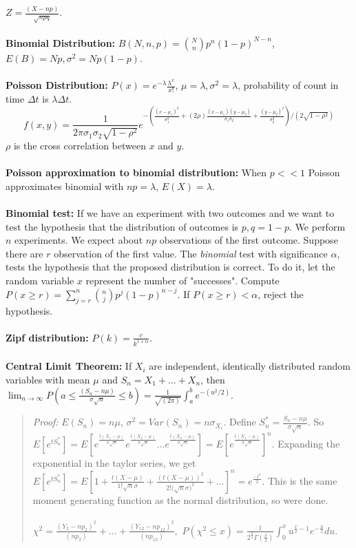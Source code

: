 $Z={\frac {(X-np)} {\sqrt {npq}}}$.
\\
\\
{\bf Binomial Distribution:} $B(N, n, p) = {N \choose n} p^{n}(1-p)^{N-n}$,
$E(B)=Np, \sigma^2= Np(1-p)$.
\\
\\
{\bf Poisson Distribution:} $P(x)= e^{- \lambda} {\frac {\lambda^{x}} {x!}}$, 
$\mu= \lambda, \sigma^2= \lambda$, probability of count in time $\Delta t$ is
$\lambda \Delta t$.  
$$f(x,y)= {\frac 1 {2 \pi \sigma_1 \sigma_2 {\sqrt {1- \rho^2}}}}
e^{- ({\frac {(x-\mu_1)^2} {\sigma_1^2}} +
(2 \rho){\frac {(x-\mu_1)(y- \mu_2)} {\sigma_1 \sigma_2}} +
{\frac {(y-\mu_2)^2} {\sigma_2^2}})/(2 {\sqrt {1-\rho^2}})}$$ 
$\rho$ is the cross correlation between $x$ and $y$.
\\
\\
{\bf Poisson approximation to binomial distribution:}  
When $p<<1$ Poisson approximates binomial with
$np= \lambda$, $E(X)= \lambda$.
\\
\\
{\bf Binomial test:}  If we have an experiment with two outcomes and we want to test the hypothesis that the
distribution of outcomes is $p, q=1-p$.  We perform $n$ experiments.  We expect about $np$ observations of the
first outcome.  Suppose there are $r$ observation of the first value.  The \emph{binomial} test with significance $\alpha$,
tests the hypothesis that the proposed distribution is correct.  To do it, let the random variable
$x$ represent the number of "successes".  Compute $P(x \geq r) = \sum_{j=r}^n {n \choose j} p^j (1-p)^{n-j}$.
If $P(x \geq r) < \alpha$, reject the hypothesis.
\\
\\
{\bf Zipf distribution:}  $P(k)= {\frac c {k^{1+\alpha}}}$.
\\
\\
{\bf Central Limit Theorem:}  If $X_i$ are independent, identically distributed
random variables with mean $\mu$ and
$S_{n}= X_{1}+ \ldots + X_{n}$, then $\lim_{n \rightarrow \infty}
P(a \leq  {\frac {(S_{n}-n \mu)} {\sigma {\sqrt n}}} \leq b) =
{\frac {1} {\sqrt {(2 \pi)}}} \int_{a}^{b} e^{-(u^{2}/2)}$.
\begin{quote}
\emph{Proof:} $E(S_n)= n \mu$, $\sigma^2=Var(S_n)= n\sigma_{X_i}$.  Define
$S^*_n= {\frac {S_n -n\mu} {\sigma {\sqrt n}}}$.  So
$E[e^{tS^*_n}]=E[
e^{\frac {t(X_1-\mu)} {\sigma {\sqrt n}}}
e^{\frac {t(X_2-\mu)} {\sigma {\sqrt n}}} \ldots
e^{\frac {t(X_n-\mu)} {\sigma {\sqrt n}}}]=
E[e^{\frac {t(X_1-\mu)} {\sigma {\sqrt n}}}]^n$.
Expanding the exponential in the taylor series, we get
$E[e^{tS^*_n}]=E[1+
{\frac {t(X-\mu)} {1! {\sqrt n} \sigma}}+
{\frac {(t(X-\mu))^2} {2! {({\sqrt n} \sigma})^2}}+
\ldots]^n = e^{\frac {-t^2} 2}$.  This is the same moment generating function
as the normal distribution, so were done.  \\
\\
$\chi^{2}= {\frac {(Y_{2}- n p_{2})^{2}} {( n p_{2})}} +...+
{\frac {(Y_{12}- n p_{12})^{2}} {(n p_{12})}},$
$P(\chi^{2} \leq x)= {\frac {1} {2^{\frac {\nu} {2}} \Gamma({\frac {\nu}
{2}})}} \int_{0}^{x} u^{{\frac {\nu} {2}}-1} e^{-{\frac {u} {2}}} du$.
\end{quote}

